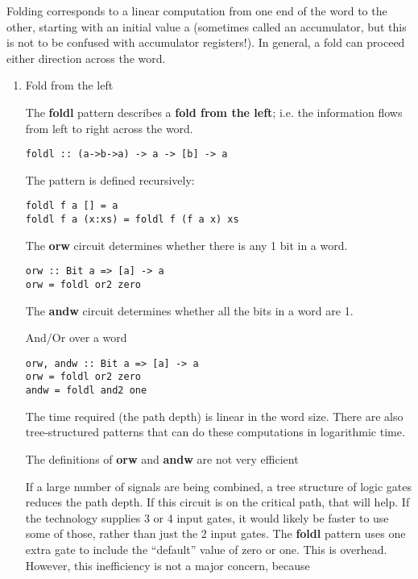 \documentclass[11pt]{article}
\begin{document}
Folding corresponds to a linear computation from one end of the word
to the other, starting with an initial value a (sometimes called an
accumulator, but this is not to be confused with accumulator
registers!).  In general, a fold can proceed either direction across
the word.

\begin{enumerate}
\item Fold from the left
\label{sec:org49ae623}

The \textbf{foldl} pattern describes a \textbf{fold from the left}; i.e. the
information flows from left to right across the word.

\begin{verbatim}
foldl :: (a->b->a) -> a -> [b] -> a
\end{verbatim}

The pattern is defined recursively:

\begin{verbatim}
foldl f a [] = a
foldl f a (x:xs) = foldl f (f a x) xs
\end{verbatim}

The \textbf{orw} circuit determines whether there is any 1 bit in a
word.

\begin{verbatim}
orw :: Bit a => [a] -> a
orw = foldl or2 zero
\end{verbatim}

The \textbf{andw} circuit determines whether all the bits in a word
are 1.

And/Or over a word

\begin{verbatim}
orw, andw :: Bit a => [a] -> a
orw = foldl or2 zero
andw = foldl and2 one
\end{verbatim}

The time required (the path depth) is linear in the word size.
There are also tree-structured patterns that can do these
computations in logarithmic time.

The definitions of \textbf{orw} and \textbf{andw} are not very efficient

If a large number of signals are being combined, a tree structure of
logic gates reduces the path depth.  If this circuit is on the
critical path, that will help.  If the technology supplies 3 or 4
input gates, it would likely be faster to use some of those, rather
than just the 2 input gates.  The \textbf{foldl} pattern uses one extra gate
to include the ``default'' value of zero or one.  This is overhead.
However, this inefficiency is not a major concern, because


\end{enumerate}
\end{document}
